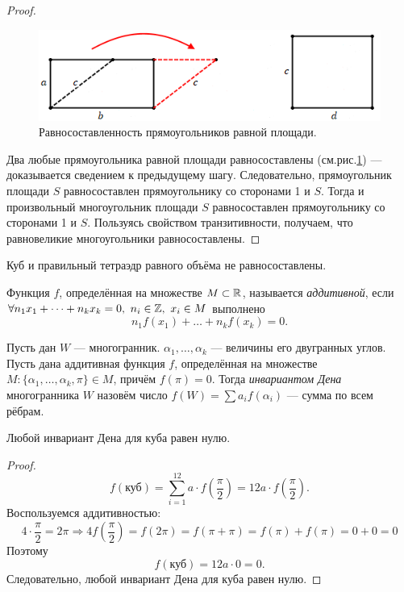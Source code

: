 \begin{proof}
    \begin{figure}[H]
        \centering
        \includegraphics[scale=0.7]{images/c8.3.png}
        \caption{Равносоставленность прямоугольников равной площади.}
        \label{fig:c8.3}
    \end{figure}

    Два любые прямоугольника равной площади равносоставлены (см.рис.\ref{fig:c8.3}) — доказывается сведением к предыдущему шагу. Следовательно, прямоугольник площади $S$ равносоставлен прямоугольнику со сторонами 1 и $S$. Тогда и произвольный многоугольник площади $S$ равносоставлен прямоугольнику со сторонами 1 и $S$. Пользуясь свойством транзитивности, получаем, что равновеликие многоугольники равносоставлены.
\end{proof}


\begin{theorem}[Ден]
    Куб и правильный тетраэдр равного объёма не равносоставлены.
\end{theorem}

\begin{definition}
    Функция $f$, определённая на множестве $M \subset \mathbb{R}$, называется \textit{аддитивной}, если $\forall n_1 x_1 + \dots + n_k x_k = 0, \ n_i \in \mathbb{Z}, \ x_i \in M$ выполнено $$n_1 f(x_1) + \dots + n_k f(x_k) = 0.$$ 
\end{definition}

\begin{definition}
    Пусть дан $W$ — многогранник. $\alpha_1, \dots, \alpha_k$ — величины его двугранных углов. Пусть дана аддитивная функция $f$, определённая на множестве $M: \{\alpha_1, \dots, \alpha_k, \pi\} \in M$, причём $f(\pi) = 0$. Тогда \textit{инвариантом Дена} многогранника $W$ назовём число $f(W) = \sum a_i f(\alpha_i)$ — сумма по всем рёбрам.
\end{definition}

\begin{statement}
    Любой инвариант Дена для куба равен нулю.
\end{statement}
\begin{proof}
    \[f(\text{куб}) = \sum_{i = 1}^{12} a \cdot f\left(\frac{\pi}2\right) = 12 a \cdot f\left(\frac{\pi}2\right).\]
    Воспользуемся аддитивностью: 
    \[4 \cdot \frac{\pi}2 = 2 \pi \Longrightarrow 4 f\left(\frac{\pi}2\right) = f(2 \pi) = f(\pi + \pi) = f(\pi) + f(\pi) = 0 + 0 = 0\]
    Поэтому \[f(\text{куб}) = 12 a \cdot 0 = 0.\]
    Следовательно, любой инвариант Дена для куба равен нулю.
\end{proof}

